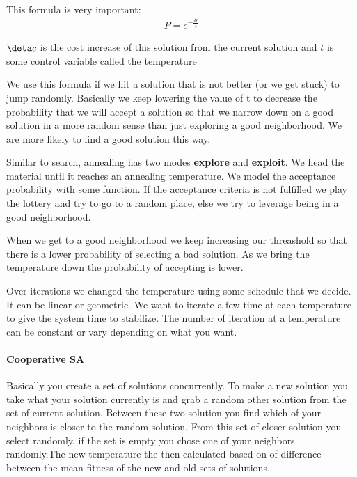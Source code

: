 \documentclass[12pt]{article}
\begin{document}
This formula is very important:
\begin{align}
  P = e^{-\frac{\delta c}{t}}
\end{align}

$\deta c$ is the cost increase of this solution from the current solution and $t$ is some control variable called the temperature

We use this formula if we hit a solution that is not better (or we get stuck) to jump randomly. Basically we keep lowering the value of t to decrease the probability that we will accept a solution so that we narrow down on a good solution in a more random sense than just exploring a good neighborhood. We are more likely to find a good solution this way.

Similar to search, annealing has two modes \textbf{explore} and \textbf{exploit}. We head the material until it reaches an annealing temperature. We model the acceptance probability with some function. If the acceptance criteria is not fulfilled we play the lottery and try to go to a random place, else we try to leverage being in a good neighborhood. 

When we get to a good neighborhood we keep increasing our threashold so that there is a lower probability of selecting a bad solution. As we bring the temperature down the probability of accepting is lower. 

Over iterations we changed the temperature using some schedule that we decide. It can be linear or geometric. We want to iterate a few time at each temperature to give the system time to stabilize. The number of iteration at a temperature can be constant or vary depending on what you want.


\paragraph{Cooperative SA} %
\label{par:cooperative_sa}
Basically you create a set of solutions concurrently. To make a new solution you take what your solution currently is and grab a random other solution from the set of current solution. Between these two solution you find which of your neighbors is closer to the random solution. From this set of closer solution you select randomly, if the set is empty you chose one of your neighbors randomly.The new temperature the then calculated based on of difference between the mean fitness of the new and old sets of solutions.






  
\end{document}
